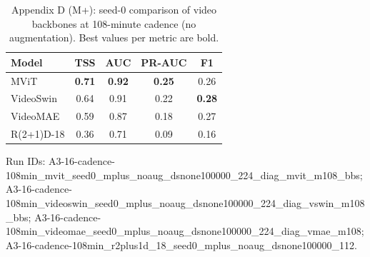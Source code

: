 \begin{table}[p]
\centering
\scriptsize
\caption{Appendix D (M+): seed-0 comparison of video backbones at 108-minute cadence (no augmentation). Best values per metric are bold.}
\label{tab:appD_m_reordered}
\begin{tabular}{lcccc}
\toprule
Model & TSS & AUC & PR-AUC & F1 \\
\midrule
MViT & \textbf{0.71} & \textbf{0.92} & \textbf{0.25} & 0.26 \\
VideoSwin & 0.64 & 0.91 & 0.22 & \textbf{0.28} \\
VideoMAE & 0.59 & 0.87 & 0.18 & 0.27 \\
R(2+1)D-18 & 0.36 & 0.71 & 0.09 & 0.16 \\
\bottomrule
\end{tabular}
\vspace{1mm}
\begin{flushleft}\scriptsize Run IDs: A3-16-cadence-108min\_mvit\_seed0\_mplus\_noaug\_dsnone100000\_224\_diag\_mvit\_m108\_bbs; A3-16-cadence-108min\_videoswin\_seed0\_mplus\_noaug\_dsnone100000\_224\_diag\_vswin\_m108\_bbs; A3-16-cadence-108min\_videomae\_seed0\_mplus\_noaug\_dsnone100000\_224\_diag\_vmae\_m108; A3-16-cadence-108min\_r2plus1d\_18\_seed0\_mplus\_noaug\_dsnone100000\_112.\end{flushleft}
\end{table}
